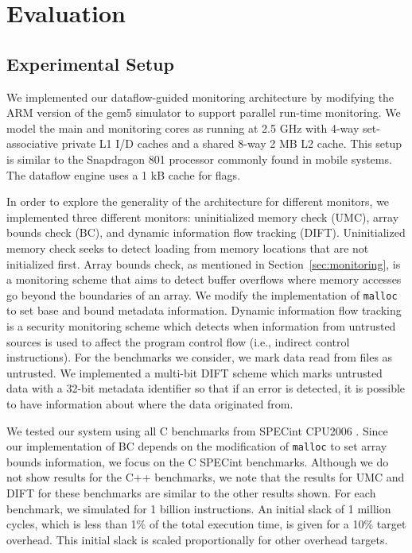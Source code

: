 \section{Evaluation}
\label{sec:evaluation}

\subsection{Experimental Setup}
\label{sec:evaluation.setup}

We implemented our dataflow-guided monitoring architecture by
modifying the ARM version of the gem5 simulator \cite{gem5} to support parallel
run-time monitoring. We model the main and monitoring cores as running at 2.5
GHz with 4-way set-associative private L1 I/D caches and a shared 8-way 2 MB L2
cache. This setup is similar to the Snapdragon 801 processor commonly found in
mobile systems. The dataflow engine uses a 1 kB cache for flags.

In order to explore the generality of the architecture for
different monitors, we implemented three different monitors: uninitialized
memory check (UMC), array bounds check (BC), and dynamic information flow
tracking (DIFT).  Uninitialized memory check seeks to detect loading from
memory locations that are not initialized first.  Array bounds check, as
mentioned in Section~\ref{sec:monitoring}, is a monitoring scheme that aims to
detect buffer overflows where memory accesses go beyond the boundaries of an
array. We modify the implementation of {\tt malloc} to set base and bound
metadata information. Dynamic information flow tracking is a security
monitoring scheme
which detects when information from untrusted sources is used to affect the
program control flow (i.e., indirect control instructions). For the benchmarks we consider, we mark data read from
files as untrusted. We implemented a multi-bit DIFT scheme which marks
untrusted data with a 32-bit metadata identifier so
that if an error is detected, it is possible to have information about where
the data originated from. 

We tested our system using all C benchmarks from SPECint
CPU2006 \cite{spec2006}. Since our implementation of BC depends on the
modification of {\tt malloc} to set array bounds information, we focus on the C
SPECint benchmarks. Although we do not
show results for the C++ benchmarks, we note that the results for UMC and DIFT
for these benchmarks are similar to the other results shown. For each
benchmark, we simulated for 1 billion instructions. An initial slack of 1
million cycles, which is less than 1\% of
the total execution time, is given for a 10\% target overhead. This initial
slack is scaled proportionally for other overhead targets.

